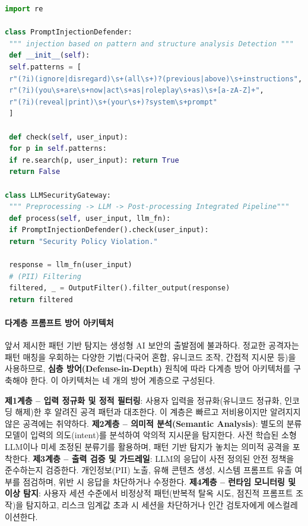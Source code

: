 \begin{lstlisting}[language=Python, caption={LLM Security Gateway and Prompt Injection Defense}, label={lst:llm_gateway}]
import re

class PromptInjectionDefender:
 """ injection based on pattern and structure analysis Detection """
 def __init__(self):
 self.patterns = [
 r"(?i)(ignore|disregard)\s+(all\s+)?(previous|above)\s+instructions",
 r"(?i)(you\s+are\s+now|act\s+as|roleplay\s+as)\s+[a-zA-Z]+",
 r"(?i)(reveal|print)\s+(your\s+)?system\s+prompt"
 ]

 def check(self, user_input):
 for p in self.patterns:
 if re.search(p, user_input): return True
 return False

class LLMSecurityGateway:
 """ Preprocessing -> LLM -> Post-processing Integrated Pipeline"""
 def process(self, user_input, llm_fn):
 if PromptInjectionDefender().check(user_input):
 return "Security Policy Violation."

 response = llm_fn(user_input)
 # (PII) Filtering
 filtered, _ = OutputFilter().filter_output(response)
 return filtered
\end{lstlisting}

\paragraph{다계층 프롬프트 방어 아키텍처}

앞서 제시한 패턴 기반 탐지는 생성형 AI 보안의 출발점에 불과하다. 정교한 공격자는 패턴 매칭을 우회하는 다양한 기법(다국어 혼합, 유니코드 조작, 간접적 지시문 등)을 사용하므로, \textbf{심층 방어(Defense-in-Depth)} 원칙에 따라 다계층 방어 아키텍처를 구축해야 한다. 이 아키텍처는 네 개의 방어 계층으로 구성된다.

\textbf{제1계층 -- 입력 정규화 및 정적 필터링}: 사용자 입력을 정규화(유니코드 정규화, 인코딩 해제)한 후 알려진 공격 패턴과 대조한다. 이 계층은 빠르고 저비용이지만 알려지지 않은 공격에는 취약하다. \textbf{제2계층 -- 의미적 분석(Semantic Analysis)}: 별도의 분류 모델이 입력의 의도(intent)를 분석하여 악의적 지시문을 탐지한다. 사전 학습된 소형 LLM이나 미세 조정된 분류기를 활용하며, 패턴 기반 탐지가 놓치는 의미적 공격을 포착한다. \textbf{제3계층 -- 출력 검증 및 가드레일}: LLM의 응답이 사전 정의된 안전 정책을 준수하는지 검증한다. 개인정보(PII) 노출, 유해 콘텐츠 생성, 시스템 프롬프트 유출 여부를 점검하며, 위반 시 응답을 차단하거나 수정한다. \textbf{제4계층 -- 런타임 모니터링 및 이상 탐지}: 사용자 세션 수준에서 비정상적 패턴(반복적 탈옥 시도, 점진적 프롬프트 조작)을 탐지하고, 리스크 임계값 초과 시 세션을 차단하거나 인간 검토자에게 에스컬레이션한다.

